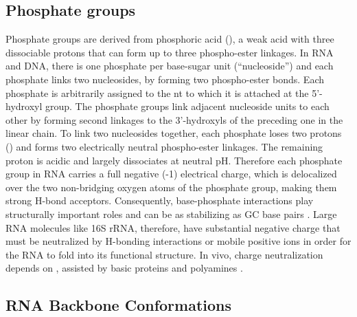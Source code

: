 \subsection{Phosphate groups}

Phosphate groups are derived from phosphoric acid (), a weak acid with
three dissociable protons that can form up to three phospho-ester linkages. In
RNA and DNA, there is one phosphate per base-sugar unit (``nucleoside'') and
each phosphate links two nucleosides, by forming two phospho-ester bonds. Each
phosphate is arbitrarily assigned to the nt to which it is attached at the
5’-hydroxyl group. The phosphate groups link adjacent nucleoside units to each
other by forming second linkages to the 3'-hydroxyls of the preceding one in the
linear chain. To link two nucleosides together, each phosphate loses two protons
() and forms two electrically neutral phospho-ester linkages. The
remaining proton is acidic and largely dissociates at neutral pH. Therefore each
phosphate group in RNA carries a full negative (-1) electrical charge, which is
delocalized over the two non-bridging oxygen atoms of the phosphate group,
making them strong H-bond acceptors. Consequently, base-phosphate interactions
play structurally important roles and can be as stabilizing as GC base pairs
\cite{Zirbel2009, Sponer2010}. Large RNA molecules like 16S rRNA, therefore,
have substantial negative charge that must be neutralized by H-bonding
interactions or mobile positive ions in order for the RNA to fold into its
functional structure. In vivo, charge neutralization depends on ,
assisted by basic proteins and polyamines \cite{Draper2008}.

\subsection{RNA Backbone Conformations}

